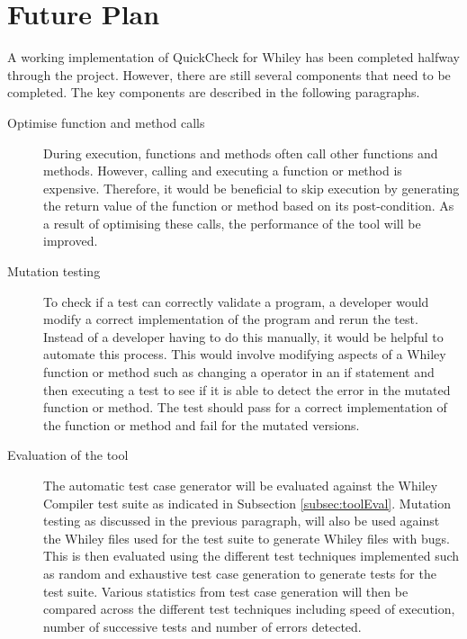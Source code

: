 \section{Future Plan}\label{section:future}


A working implementation of QuickCheck for Whiley has been completed halfway through the project. However, there are still several components that need to be completed. The key components are described in the following paragraphs.

\begin{description}
	\item[Optimise function and method calls]
	During execution, functions and methods often call other functions and methods.
	However, calling and executing a function or method is expensive.
	Therefore, it would be beneficial to skip execution by generating the return value of the function or method based on its post-condition.
	As a result of optimising these calls, the performance of the tool will be improved.
	\item[Mutation testing]
	To check if a test can correctly validate a program, a developer would modify a correct implementation of the program and rerun the test.
	Instead of a developer having to do this manually, it would be helpful to automate this process.
	This would involve modifying aspects of a Whiley function or method such as changing a operator in an if statement and then executing a test to see if it is able to detect the error in the mutated function or method.
	The test should pass for a correct implementation of the function or method and fail for the mutated versions.
	\item[Evaluation of the tool] The automatic test case generator will be evaluated against the Whiley Compiler test suite as indicated in Subsection \ref{subsec:toolEval}.
	Mutation testing as discussed in the previous paragraph, will also be used against the Whiley files used for the test suite to generate Whiley files with bugs. 
	This is then evaluated using the different test techniques implemented such as random and exhaustive test case generation to generate tests for the test suite. Various statistics from test case generation will then be compared across the different test techniques including speed of execution, number of successive tests and number of errors detected.
\end{description}

